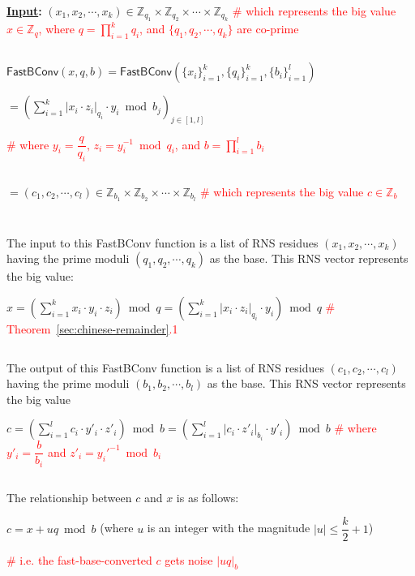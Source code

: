 \begin{tcolorbox}[title={\textbf{\tboxlabel{\ref*{subsec:rns-fastbconv}} Fast Base Conversion: \textsf{FastBConv}}}]


\textbf{\underline{Input}:} $(x_1, x_2, \cdots, x_k) \in \mathbb{Z}_{q_1} \times \mathbb{Z}_{q_2} \times \cdots \times \mathbb{Z}_{q_k}$ \textcolor{red}{ \# which represents the big value $x \in \mathbb{Z}_q$, where $q = \prod\limits_{i=1}^kq_i$, and $\{q_1, q_2, \cdots, q_k\}$ are co-prime}

$ $

$\textsf{FastBConv}(x, q, b)= \textsf{FastBConv}(\{x_i\}_{i=1}^{k}, \{q_i\}_{i=1}^{k}, \{b_i\}_{i=1}^{l})$

$ = \left( \sum\limits_{i=1}^{k} |x_i \cdot z_i|_{q_i} \cdot y_i \bmod b_j \right)_{j \in [1,l]}$  

\textcolor{red}{ \# where $y_i = \dfrac{q}{q_i} \text{, } z_i = y_i^{-1} \bmod q_i$, and $b = \prod\limits_{i=1}^lb_i$} 

$ $

$ = (c_1, c_2, \cdots, c_l) \in \mathbb{Z}_{b_1} \times \mathbb{Z}_{b_2} \times \cdots \times \mathbb{Z}_{b_l}$ \textcolor{red}{ \# which represents the big value $c \in \mathbb{Z}_b$}

$ $

$ $

The input to this \textsf{FastBConv} function is a list of RNS residues $(x_1, x_2, \cdots, x_k)$ having the prime moduli $(q_1, q_2, \cdots, q_k)$ as the base. This RNS vector represents the big value:

$x = \left(\sum\limits_{i=1}^k x_i\cdot y_i \cdot z_i\right) \bmod q = \left(\sum\limits_{i=1}^k |x_i\cdot z_i|_{q_i} \cdot y_i\right) \bmod q$ \textcolor{red}{ \# Theorem~\ref*{sec:chinese-remainder}.1}

$ $

The output of this \textsf{FastBConv} function is a list of RNS residues $(c_1, c_2, \cdots, c_l)$ having the prime moduli $(b_1, b_2, \cdots, b_l)$ as the base. This RNS vector represents the big value 

$c = \left(\sum\limits_{i=1}^l c_i\cdot y'_i \cdot z'_i\right) \bmod b = \left(\sum\limits_{i=1}^l |c_i\cdot z'_i|_{b_i} \cdot y'_i\right) \bmod b$ \textcolor{red}{ \# where $y'_i = \dfrac{b}{b_i}$ and $z'_i = {y_{i}'}^{-1} \bmod b_i$}

$ $

The relationship between $c$ and $x$ is as follows: 

$c = x + uq \bmod b$ (where $u$ is an integer with the magnitude $|u| \leq \dfrac{k}{2} + 1$) 

\textcolor{red}{ \# i.e. the fast-base-converted $c$ gets noise $|uq|_b$}


\end{tcolorbox}



